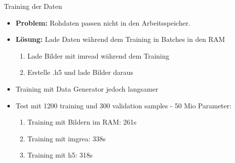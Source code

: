 \documentclass[aspectratio=1610, 9pt]{beamer}
\begin{document}
\begin{frame}{Training der Daten}
  \begin{itemize}
  \item \textbf{Problem:} Rohdaten passen nicht in den Arbeitsspeicher.
  \item \textbf{Lösung:} Lade Daten während dem Training in Batches in den RAM
    \begin{enumerate}
    \item Lade Bilder mit imread während dem Training
    \item Erstelle .h5 und lade Bilder daraus
    \end{enumerate}
  \item Training mit Data Generator jedoch langsamer
  \item Test mit 1200 training und 300 validation samples - 50 Mio Parameter:
    \begin{enumerate}
    \item Training mit Bildern im RAM: 261s
    \item Training mit imgrea: 338s
    \item Training mit h5: 318s
    \end{enumerate}
  \end{itemize}
\end{frame}
\end{document}

